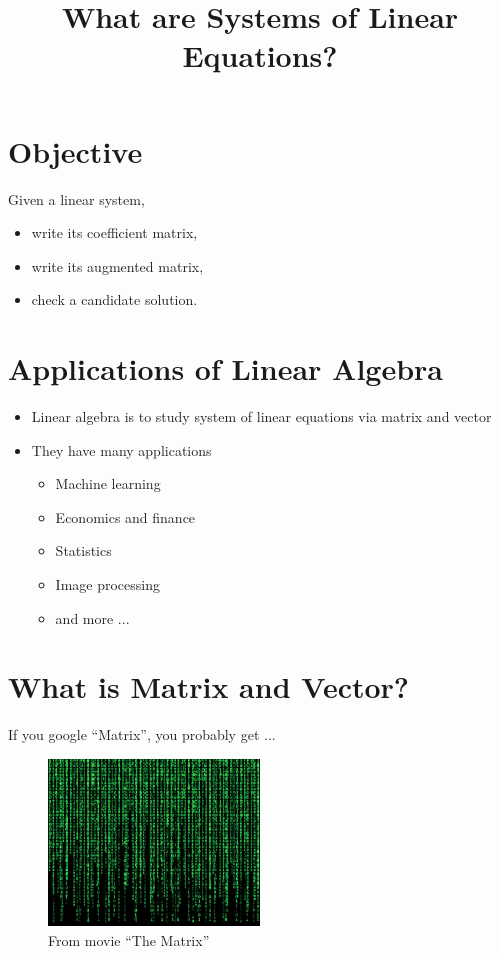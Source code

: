 \documentclass{beamer}
\title %
{What are Systems of Linear Equations?}
\author{}
\institute{WPI} %
\theoremstyle{definition}
\theoremstyle{theorem}
\begin{document}
\begin{frame}
  \titlepage
\end{frame}

\section{Objective}
\begin{frame}
 Given a linear system, 
\begin{itemize}
 \item write its coefficient matrix, 
 \item write its augmented matrix,
 \item check a candidate solution.
\end{itemize}
\end{frame}

\section{Applications of Linear Algebra}

\begin{frame}

\begin{itemize}
 \item Linear algebra is to study system of linear equations via matrix and vector
 \item They have many applications

\begin{itemize}
 \item  Machine learning
 \item Economics and finance 
 \item Statistics
 \item Image processing
 \item and more ...
\end{itemize}

\end{itemize}

\end{frame}



\section{What is Matrix and Vector?}

\begin{frame}
 {If you google ``Matrix'', you probably get ...}
 \begin{figure}
  \includegraphics[width= 0.5\textwidth]{matrix.jpg}
  \caption{From movie ``The Matrix''}
  \label{fig:matrix}
\end{figure}
\end{frame}
\end{document}
